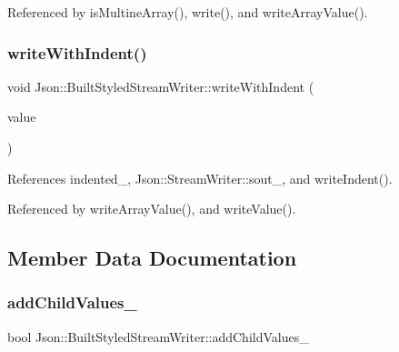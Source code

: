 Referenced by is\+Multine\+Array(), write(), and write\+Array\+Value().

\mbox{\label{structJson_1_1BuiltStyledStreamWriter_a6e80e1a0d5f64df2ec48c3c3b1284990_a6e80e1a0d5f64df2ec48c3c3b1284990}} 
\subsubsection{\texorpdfstring{write\+With\+Indent()}{writeWithIndent()}}
{\footnotesize\ttfamily void Json\+::\+Built\+Styled\+Stream\+Writer\+::write\+With\+Indent (\begin{DoxyParamCaption}\item[{\hyperlink{json_8h_a1e723f95759de062585bc4a8fd3fa4be_a1e723f95759de062585bc4a8fd3fa4be}{J\+S\+O\+N\+C\+P\+P\+\_\+\+S\+T\+R\+I\+NG} const \&}]{value }\end{DoxyParamCaption})\hspace{0.3cm}{\ttfamily [private]}}



References indented\+\_\+, Json\+::\+Stream\+Writer\+::sout\+\_\+, and write\+Indent().



Referenced by write\+Array\+Value(), and write\+Value().



\subsection{Member Data Documentation}
\mbox{\label{structJson_1_1BuiltStyledStreamWriter_abed9cc31da503b48798e7cea68c42e16_abed9cc31da503b48798e7cea68c42e16}} 
\subsubsection{\texorpdfstring{add\+Child\+Values\+\_\+}{addChildValues\_}}
{\footnotesize\ttfamily bool Json\+::\+Built\+Styled\+Stream\+Writer\+::add\+Child\+Values\+\_\+\hspace{0.3cm}{\ttfamily [private]}}



